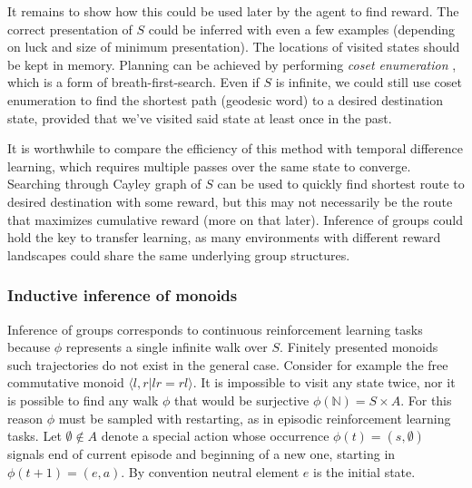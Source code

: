 \documentclass[12pt]{article}
\begin{document}
It remains to show how this could be used later by the agent to find reward.
The correct presentation of $S$ could be inferred with even a few examples (depending on luck and size of minimum  presentation). The locations of visited states should be kept in memory. Planning can be achieved by performing \textit{coset enumeration} \cite{johnson_1997}, which is a form of breath-first-search. Even if $S$ is infinite, we could still use coset enumeration to find the shortest path (geodesic word) to a desired destination state, provided that we've visited said state at least once in the past. 

It is worthwhile to compare the efficiency of this method with temporal difference learning, which requires multiple passes over the same state to converge. Searching through Cayley graph of $S$ can be used to quickly find shortest route to desired destination with some reward, but this may not necessarily be the route that maximizes cumulative reward (more on that later). Inference of groups could hold the key to transfer learning, as many environments with different reward landscapes could share the same underlying group structures. 

\subsubsection{Inductive inference of monoids}

Inference of groups corresponds to continuous reinforcement learning tasks because $\phi$ represents a single infinite walk over $S$.
Finitely presented monoids such trajectories do not exist in the general case. Consider for example the free commutative monoid $\langle l,r | lr=rl \rangle$. It is impossible to visit any state twice, nor it is possible to find any walk $\phi$ that would be surjective $\phi(\mathbb{N})=S\times A$. For this reason $\phi$ must be sampled with restarting, as in episodic reinforcement learning tasks. Let $\emptyset\notin A$ denote a special action whose occurrence $\phi(t)=(s,\emptyset)$ signals end of current episode and beginning of a new one, starting in $\phi(t+1)=(e,a)$. By convention neutral element $e$ is the initial state.
\end{document}
